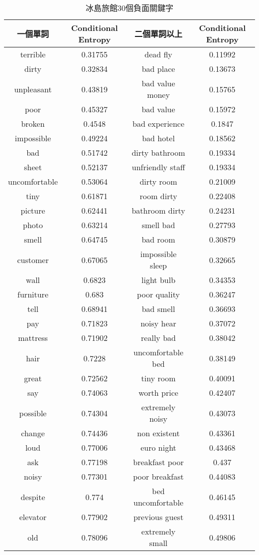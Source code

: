 	\begin{table}[H] 
	\centering
	\caption{冰島旅館30個負面關鍵字}
	\begin{tabular}{|cc||cc|}
	\toprule
	一個單詞 & Conditional Entropy & 二個單詞以上 & Conditional Entropy \\
	\midrule
	terrible & 0.31755 & dead fly & 0.11992\\
	\midrule
	dirty & 0.32834 & bad place & 0.13673 \\
	\midrule
	unpleasant & 0.43819 & bad value money & 0.15765 \\
	\midrule
	poor & 0.45327 & bad value  & 0.15972 \\
	\midrule
	broken & 0.4548 & bad experience & 0.1847 \\
	\midrule
	impossible & 0.49224 & bad hotel & 0.18562 \\
	\midrule
	bad & 0.51742 & dirty bathroom & 0.19334 \\
	\midrule
	sheet & 0.52137 & unfriendly staff & 0.19334 \\
	\midrule
	uncomfortable & 0.53064 & dirty room & 0.21009 \\
	\midrule
	tiny & 0.61871 & room dirty & 0.22408 \\
	\midrule
	picture & 0.62441 & bathroom dirty & 0.24231 \\
	\midrule
	photo & 0.63214 & smell bad & 0.27793 \\
	\midrule
	smell & 0.64745 & bad room & 0.30879 \\
	\midrule
	customer & 0.67065 & impossible sleep & 0.32665 \\
	\midrule
	wall & 0.6823 & light bulb & 0.34353 \\
	\midrule
	furniture & 0.683 & poor quality & 0.36247 \\
	\midrule
	tell & 0.68941 & bad smell & 0.36693 \\
	\midrule
	pay & 0.71823 & noisy hear & 0.37072 \\
	\midrule
	mattress & 0.71902 & really bad & 0.38042 \\
	\midrule
	hair & 0.7228 & uncomfortable bed & 0.38149 \\
	\midrule
	great & 0.72562 & tiny room & 0.40091 \\
	\midrule
	say & 0.74063 & worth price & 0.42407 \\
	\midrule
	possible & 0.74304 & extremely noisy & 0.43073 \\
	\midrule
	change & 0.74436 & non existent & 0.43361 \\
	\midrule
	loud & 0.77006 & euro night & 0.43468 \\
	\midrule
	ask & 0.77198 & breakfast poor & 0.437 \\
	\midrule
	noisy & 0.77301 & poor breakfast & 0.44083 \\
	\midrule
	despite & 0.774 & bed uncomfortable & 0.46145 \\
	\midrule
	elevator & 0.77902 & previous guest & 0.49311 \\
	\midrule
	old & 0.78096 & extremely small & 0.49806 \\
	\bottomrule
	\end{tabular}
	\label{tab1}   
	\end{table}
	

